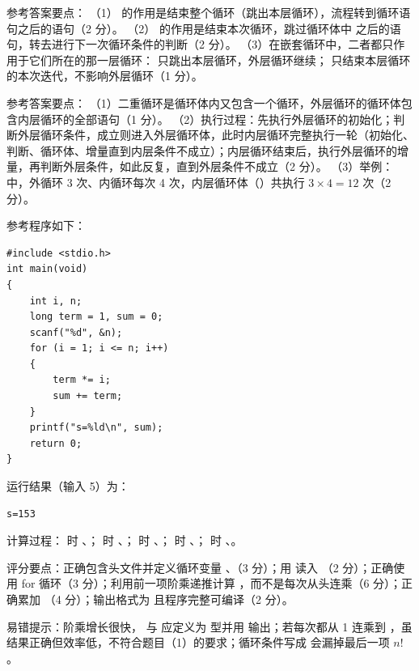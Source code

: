\documentclass[a4paper,11pt]{article}
\begin{document}
\q 参考答案要点：
（1） 的作用是结束整个循环（跳出本层循环），流程转到循环语句之后的语句（2 分）。
（2） 的作用是结束本次循环，跳过循环体中  之后的语句，转去进行下一次循环条件的判断（2 分）。
（3）在嵌套循环中，二者都只作用于它们所在的那一层循环： 只跳出本层循环，外层循环继续； 只结束本层循环的本次迭代，不影响外层循环（1 分）。

\q 参考答案要点：
（1）二重循环是循环体内又包含一个循环，外层循环的循环体包含内层循环的全部语句（1 分）。
（2）执行过程：先执行外层循环的初始化；判断外层循环条件，成立则进入外层循环体，此时内层循环完整执行一轮（初始化、判断、循环体、增量直到内层条件不成立）；内层循环结束后，执行外层循环的增量，再判断外层条件，如此反复，直到外层条件不成立（2 分）。
（3）举例： 中，外循环 3 次、内循环每次 4 次，内层循环体（）共执行 $3\times4=12$ 次（2 分）。


\q 参考程序如下：
\begin{lstlisting}[language={[custom]C}]
#include <stdio.h>
int main(void)
{
    int i, n;
    long term = 1, sum = 0;
    scanf("%d", &n);
    for (i = 1; i <= n; i++)
    {
        term *= i;
        sum += term;
    }
    printf("s=%ld\n", sum);
    return 0;
}
\end{lstlisting}
\begin{analysis}运行结果（输入 5）为：
\begin{lstlisting}
s=153
\end{lstlisting}
计算过程： 时 、； 时 、； 时 、； 时 、； 时 、。\end{analysis}
\begin{analysis}评分要点：正确包含头文件并定义循环变量 、（3 分）；用  读入 （2 分）；正确使用 for 循环（3 分）；利用前一项阶乘递推计算 ，而不是每次从头连乘（6 分）；正确累加 （4 分）；输出格式为  且程序完整可编译（2 分）。\end{analysis}
\begin{analysis}易错提示：阶乘增长很快， 与  应定义为  型并用  输出；若每次都从 1 连乘到 ，虽结果正确但效率低，不符合题目（1）的要求；循环条件写成  会漏掉最后一项 $n!$。\end{analysis}
\end{document}
